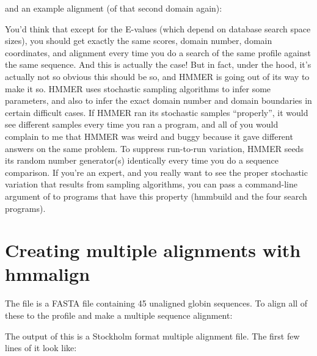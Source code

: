 
and an example alignment (of that second domain again):


You'd think that except for the E-values (which depend on database
search space sizes), you should get exactly the same scores, domain
number, domain coordinates, and alignment every time you do a search
of the same profile against the same sequence. And this is actually
the case! But in fact, under the hood, it's actually not so obvious
this should be so, and HMMER is going out of its way to make it
so. HMMER uses stochastic sampling algorithms to infer some
parameters, and also to infer the exact domain number and domain
boundaries in certain difficult cases. If HMMER ran its stochastic
samples ``properly'', it would see different samples every time you
ran a program, and all of you would complain to me that HMMER was
weird and buggy because it gave different answers on the same
problem. To suppress run-to-run variation, HMMER seeds its random
number generator(s) identically every time you do a sequence
comparison. If you're an expert, and you really want to see the proper
stochastic variation that results from sampling algorithms,
you can pass a command-line argument of  to
programs that have this property (hmmbuild and the four search
programs).







\section{Creating multiple alignments with hmmalign}

The file  is a FASTA file containing 45
unaligned globin sequences. To align all of these to the
 profile and make a multiple sequence alignment:

   \vspace{1ex}
   \vspace{1ex}

The output of this is a Stockholm format multiple alignment file. The
first few lines of it look like:


